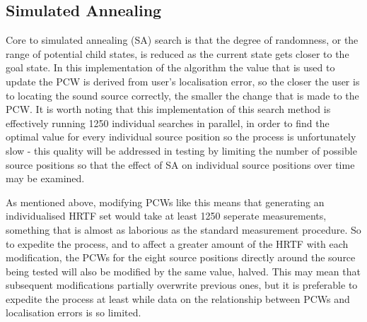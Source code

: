 \subsection{Simulated Annealing}
Core to simulated annealing (SA) search is that the degree of randomness, or the range of potential child states, is reduced as the current state gets closer to the goal state. In this implementation of the algorithm the value that is used to update the PCW is derived from user's localisation error, so the closer the user is to locating the sound source correctly, the smaller the change that is made to the PCW. It is worth noting that this implementation of this search method is effectively running 1250 individual searches in parallel, in order to find the optimal value for every individual source position so the process is unfortunately slow - this quality will be addressed in testing by limiting the number of possible source positions so that the effect of SA on individual source positions over time may be examined.

As mentioned above, modifying PCWs like this means that generating an individualised HRTF set would take at least 1250 seperate measurements, something that is almost as laborious as the standard measurement procedure. So to expedite the process, and to affect a greater amount of the HRTF with each modification, the PCWs for the eight source positions directly around the source being tested will also be modified by the same value, halved. This may mean that subsequent modifications partially overwrite previous ones, but it is preferable to expedite the process at least while data on the relationship between PCWs and localisation errors is so limited. 


